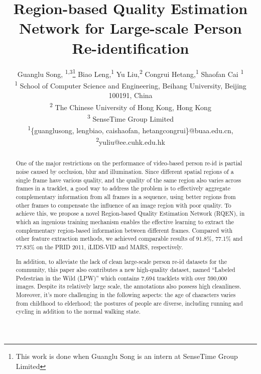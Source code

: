 \documentclass[letterpaper]{article} %
\begin{document}
\title{Region-based Quality Estimation Network for Large-scale Person Re-identification}
\author{Guanglu Song, \textsuperscript{1,3}\thanks{This work is done when Guanglu Song is an intern at SenseTime Group Limited} Biao Leng,\textsuperscript{1} Yu Liu,\textsuperscript{2} Congrui Hetang,\textsuperscript{1} Shaofan Cai \textsuperscript{1}\\
\textsuperscript{1} School of Computer Science and Engineering, Beihang University, Beijing 100191, China\\
\textsuperscript{2} The Chinese University of Hong Kong, Hong Kong\\
\textsuperscript{3} SenseTime Group Limited\\
\textsuperscript{1}\{guanglusong, lengbiao, caishaofan, hetangcongrui\}@buaa.edu.cn, \textsuperscript{2}yuliu@ee.cuhk.edu.hk
}

\maketitle
\begin{abstract}
One of the major restrictions on the performance of video-based person re-id is partial noise caused by occlusion, blur and illumination. Since different spatial regions of a single frame have various quality, and the quality of the same region also varies across frames in a tracklet, a good way to address the problem is to effectively aggregate complementary information from all frames in a sequence, using better regions from other frames to compensate the influence of an image region with poor quality. To achieve this, we propose a novel Region-based Quality Estimation Network (RQEN), in which an ingenious training mechanism enables the effective learning to extract the complementary region-based information between different frames. Compared with other feature extraction methods, we achieved comparable results of 91.8\%, 77.1\% and 77.83\% on the PRID 2011, iLIDS-VID and MARS, respectively.

In addition, to alleviate the lack of clean large-scale person re-id datasets for the community, this paper also contributes a new high-quality dataset, named ``Labeled Pedestrian in the Wild (LPW)'' which contains 7,694 tracklets with over 590,000 images. Despite its relatively large scale, the annotations also possess high cleanliness. Moreover, it's more challenging in the following aspects: the age of characters varies from childhood to elderhood; the postures of people are diverse, including running and cycling in addition to the normal walking state.
\end{abstract}
\end{document}
